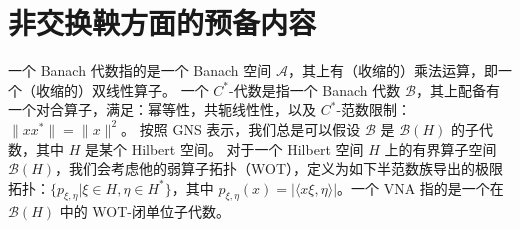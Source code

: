 \section{非交换鞅方面的预备内容}
    一个 Banach 代数指的是一个 Banach 空间 $\mathcal{A}$，其上有（收缩的）乘法运算，即一个（收缩的）双线性算子。
    一个 $C^\ast$-代数是指一个 Banach 代数 $\mathcal{B}$，其上配备有一个对合算子，满足：幂等性，共轭线性性，以及 $C^\ast$-范数限制：$\|xx^\ast\|=\|x\|^2$。
    按照 GNS 表示，我们总是可以假设 $\mathcal{B}$ 是 $\mathcal{B}(H)$ 的子代数，其中 $H$ 是某个 Hilbert 空间。
    对于一个 Hilbert 空间 $H$ 上的有界算子空间 $\mathcal{B}(H)$，我们会考虑他的弱算子拓扑（WOT），定义为如下半范数族导出的极限拓扑：$\{p_{\xi,\eta}|\xi\in H,\eta\in H^\ast\}$，其中 $p_{\xi,\eta}(x)=|\langle x\xi,\eta\rangle|$。一个 VNA 指的是一个在 $\mathcal{B}(H)$ 中的 WOT-闭单位子代数。












